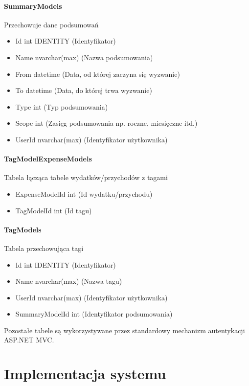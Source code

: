 \documentclass[10pt,titlepage]{article}
\begin{document}
\paragraph[short]{SummaryModels}
Przechowuje dane podsumowań
\begin{itemize}
  \item Id int IDENTITY (Identyfikator)
  \item Name nvarchar(max) (Nazwa podsumowania)
  \item From datetime (Data, od której zaczyna się wyzwanie)
  \item To datetime (Data, do której trwa wyzwanie)
  \item Type int (Typ podsumowania)
  \item Scope int (Zasięg podsumowania np. roczne, miesięczne itd.)
  \item UserId nvarchar(max) (Identyfikator użytkownika)
\end{itemize}
\paragraph[short]{TagModelExpenseModels}
Tabela łącząca tabele wydatków/przychodów z tagami
\begin{itemize}
  \item ExpenseModelId int (Id wydatku/przychodu)
  \item TagModelId int (Id tagu)
\end{itemize}
\paragraph[short]{TagModels}
Tabela przechowująca tagi
\begin{itemize}
  \item Id int IDENTITY (Identyfikator)
  \item Name nvarchar(max) (Nazwa tagu)
  \item UserId nvarchar(max) (Identyfikator użytkownika)
  \item SummaryModelId int (Identyfikator podsumowania)
\end{itemize}
Pozostałe tabele są wykorzystywane przez standardowy mechanizm autentykacji ASP.NET MVC.
\section{Implementacja systemu}
\end{document}
